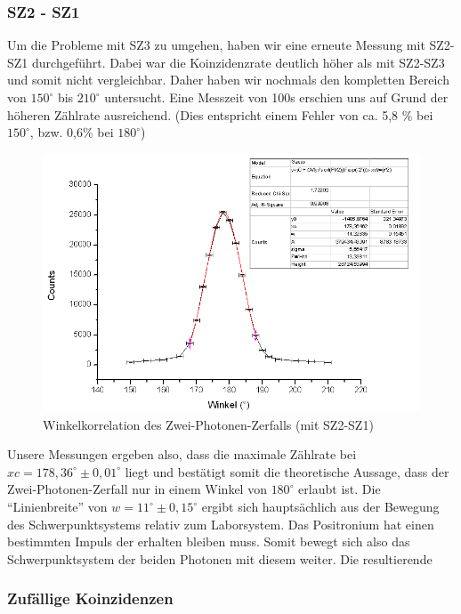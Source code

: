 
\subsubsection{SZ2 - SZ1}

Um die Probleme mit SZ3 zu umgehen, haben wir eine erneute Messung mit SZ2-SZ1 durchgeführt. Dabei war die Koinzidenzrate deutlich höher als mit SZ2-SZ3 und somit nicht vergleichbar. Daher haben wir nochmals den kompletten Bereich von $150^\circ$ bis $210^\circ$ untersucht. Eine Messzeit von 100s erschien uns auf Grund der höheren Zählrate ausreichend. (Dies entspricht einem Fehler von ca. 5,8 \% bei $150^\circ$, bzw. 0,6\% bei $180^\circ$)

\begin{figure}[H]
 \includegraphics[width=\textwidth]{Graphen/180K.png}
 \caption{Winkelkorrelation des Zwei-Photonen-Zerfalls (mit SZ2-SZ1)}
\end{figure}

Unsere Messungen ergeben also, dass die maximale Zählrate bei $xc = 178,36^\circ \pm 0,01^\circ$ liegt und bestätigt somit die theoretische Aussage, dass der Zwei-Photonen-Zerfall nur in einem Winkel von $180^\circ$ erlaubt ist. Die "`Linienbreite"' von $w = 11^\circ \pm 0,15^\circ$ ergibt sich hauptsächlich aus der Bewegung des Schwerpunktsystems relativ zum Laborsystem. Das Positronium hat einen bestimmten Impuls der erhalten bleiben muss. Somit bewegt sich also das Schwerpunktsystem der beiden Photonen mit diesem weiter. Die resultierende 

\subsubsection{Zufällige Koinzidenzen}


